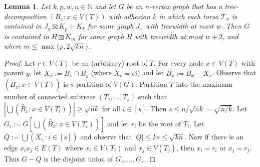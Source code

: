 \documentclass[12pt]{article}
\renewcommand{\emptyset}{\varnothing}
\renewcommand{\geq}{\geqslant}
\renewcommand{\leq}{\leqslant}
\newcommand{\NN}{\mathbb{N}}
\theoremstyle{plain}
\newtheorem{lem}[thm]{Lemma}
\theoremstyle{definition}
\begin{document}
\begin{lem}\label{CliqueSumsApices}
   Let $k,p,w,n\in \NN$ and let $G$ be an $n$-vertex graph that has a tree-decomposition $(B_x:x \in V(T))$ with adhesion $k$ in which each torso $\mathcal{T}_x$ is contained in $J_x\boxtimes K_p+K_k$ for some graph $J_x$ with treewidth at most $w$. Then $G$ is contained in $H\boxtimes K_m$ for some graph $H$ with treewidth at most $w+2$, and where $m\leq\max\{p,2\sqrt{kn}\}$.
\end{lem}

\begin{proof}
    Let $r\in V(T)$ be an (arbitrary) root of $T$. For every node $x\in V(T)$ with parent $y$, let $X_x:=B_x\cap B_y$ (where $X_r=\emptyset$) and let $\tilde{B_x}:=B_x-X_x$. Observe that $(\tilde{B}_x \colon x \in V(T))$ is a partition of $V(G)$. Partition $T$ into the maximum number of connected subtrees $(T_1,\dots,T_s)$ such that $|\bigcup (\tilde{B_x}: x \in V(T_i))|\geq \sqrt{nk}$ for all $i \in [s]$. Then $s\leq n/\sqrt{nk}=\sqrt{n/k}$. Let $G_i:=G[\bigcup(\tilde{B_x}: x \in V(T_i))]$ and let $r_i$ be the root of $T_i$.  Let $Q:= \bigcup (X_{r_i}:i\in [s])$ and observe that $|Q|\leq ks\leq \sqrt{kn}$. Now if there is an edge $x_ix_j\in E(T)$ where $x_i\in V(T_i)$ and $x_j\in V(T_j)$, then $x_i=r_i$ or $x_j=r_j$. Thus $G-Q$ is the disjoint union of $G_1,\dots,G_s$.
    

\end{proof}
\end{document}
